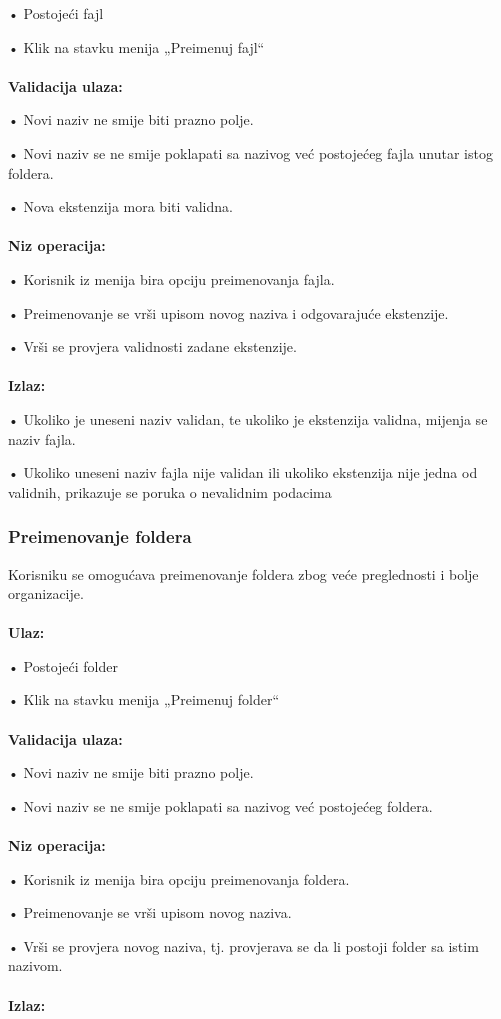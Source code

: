 \documentclass[12pt]{article}
\begin{document}
•	Postojeći fajl

•	Klik na stavku menija „Preimenuj fajl“\\ \\
\textbf{Validacija ulaza:}

•	Novi naziv ne smije biti prazno polje.

•	Novi naziv se ne smije poklapati sa nazivog već postojećeg fajla unutar istog foldera.

•	Nova ekstenzija mora biti validna.\\ \\
\textbf{Niz operacija:}

•	Korisnik iz menija bira opciju preimenovanja fajla.

•	Preimenovanje se vrši upisom novog naziva i odgovarajuće ekstenzije.

•	Vrši se provjera validnosti zadane ekstenzije.\\ \\
\textbf{Izlaz:}

•	Ukoliko je uneseni naziv validan, te ukoliko je ekstenzija validna, mijenja se naziv fajla.

•	Ukoliko uneseni naziv fajla nije validan ili ukoliko ekstenzija nije jedna od validnih, prikazuje se poruka o nevalidnim podacima

\subsubsection{Preimenovanje foldera}
Korisniku se omogućava preimenovanje foldera zbog veće preglednosti i bolje organizacije.\\ \\
\textbf{Ulaz:}

•	Postojeći folder

•	Klik na stavku menija „Preimenuj folder“\\ \\
\textbf{Validacija ulaza:}

•	Novi naziv ne smije biti prazno polje.

•	Novi naziv se ne smije poklapati sa nazivog već postojećeg foldera.\\ \\
\textbf{Niz operacija:}

•	Korisnik iz menija bira opciju preimenovanja foldera.

•	Preimenovanje se vrši upisom novog naziva.

•	Vrši se provjera novog naziva, tj. provjerava se da li postoji folder sa istim nazivom.\\ \\
\textbf{Izlaz:}
\end{document}
